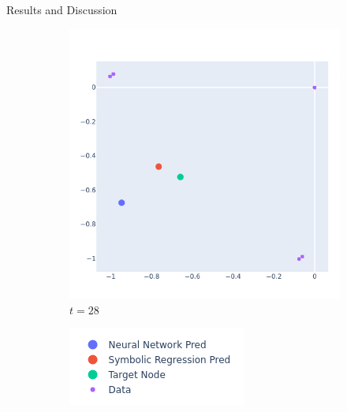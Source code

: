 \documentclass[12pt]{amsbook}
\begin{document}
\begin{chapter}{Results and Discussion}
\begin{figure}
                \begin{subfigure}[p]{0.35\textwidth}

                    \includegraphics[width=\linewidth]{./Plots/Test Only/3community/3community 3 small net.png}
                    \vspace{-1.5cm}
                    \caption{$t=28$}
                    \label{3community series 3}
                \end{subfigure}
                \begin{subfigure}[p]{0.35\textwidth}
                    \hspace{0.3cm}
                    \vspace{3.5cm}
                    \includegraphics[width=0.7\linewidth]{./Plots/key.png}

                \end{subfigure}


\end{figure}
\end{chapter}
\end{document}
